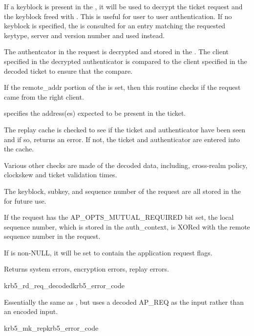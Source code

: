 If a keyblock is present in the , it will be
used to decrypt the ticket request and the keyblock freed with
. This is useful for user to user
authentication. If no keyblock is specified, the  is
consulted for an entry matching the requested keytype, server and
version number and used instead.

The authentcator in the request is decrypted and stored in the
. The client specified in the decrypted
authenticator is compared to the client specified in the decoded ticket
to ensure that the compare.

If the remote_addr portion of the  is set, 
then this routine checks if the request came from the right client.

 specifies the address(es) expected to be present
in the ticket.

The replay cache is checked to see if the ticket and authenticator have
been seen and if so, returns an error. If not, the ticket and
authenticator are entered into the cache.

Various other checks are made of the decoded data, including,
cross-realm policy, clockskew and ticket validation times.

The keyblock, subkey, and sequence number of the request are all stored
in the  for future use.

If the request has the AP_OPTS_MUTUAL_REQUIRED bit set, the local
sequence number, which is stored in the auth_context, is XORed with the
remote sequence number in the request.

If  is non-NULL, it will be set to contain the
application request flags.

Returns system errors, encryption errors, replay errors.

\begin{funcdecl}{krb5_rd_req_decoded}{krb5_error_code}{\funcinout}
\funcin
{}
\funcinout
{}
\funcout
{}
\end{funcdecl}

Essentially the same as , but uses a decoded AP_REQ
as the input rather than an encoded input.

\begin{funcdecl}{krb5_mk_rep}{krb5_error_code}{\funcinout}
\funcout
{}
\end{funcdecl}

